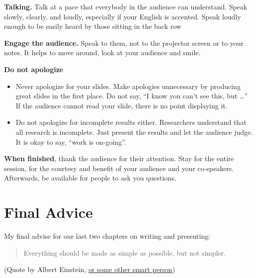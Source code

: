 \documentclass[]{book}
\providecommand{\tightlist}{%
  \setlength{\itemsep}{0pt}\setlength{\parskip}{0pt}}
\theoremstyle{definition}
\theoremstyle{definition}
\theoremstyle{definition}
\theoremstyle{remark}
\begin{document}
\textbf{Talking.} Talk at a pace that everybody in the audience can
understand. Speak slowly, clearly, and loudly, especially
if your English is accented. Speak
loudly enough to be easily heard by those sitting in
the back row

\textbf{Engage the audience.} Speak to them, not to the
projector screen or to your notes. It helps to move
around, look at your audience and smile.

\textbf{Do not apologize}

\begin{itemize}
\tightlist
\item
  Never apologize for your slides. Make apologies
  unnecessary by producing great slides in the first
  place. Do not say, ``I know you can't see this, but
  \ldots{}'' If the audience cannot read your slide, there is
  no point displaying it.
\item
  Do not apologize for incomplete results either.
  Researchers understand that all research is incomplete.
  Just present the results and let the audience
  judge. It is okay to say, ``work is on-going''.
\end{itemize}

\textbf{When finished}, thank the audience for their attention.
Stay for the entire session, for the courtesy
and benefit of your audience and your co-speakers.
Afterwards, be available for people to ask you questions.

\hypertarget{final-advice}{%
\section*{Final Advice}\label{final-advice}}

My final advise for our last two chapters on writing and presenting:

\begin{quote}
Everything should be made as simple as possible, but not simpler.
\end{quote}

(Quote by Albert Einstein, \href{https://quoteinvestigator.com/2011/05/13/einstein-simple/}{or some other smart person})


\end{document}
